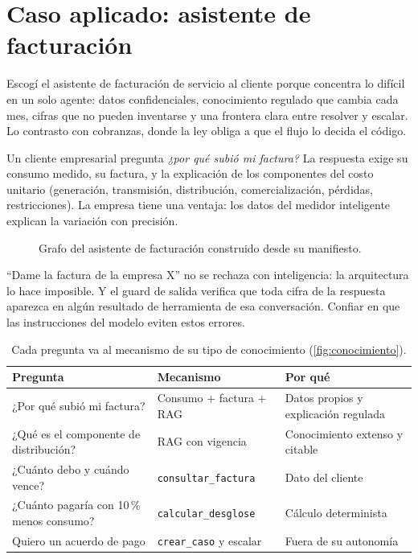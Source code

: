 \section{Caso aplicado: asistente de facturación}
\label{sec:caso}
\begin{respuesta}
Escogí el asistente de facturación de servicio al cliente porque concentra lo difícil en un solo
agente: datos confidenciales, conocimiento regulado que cambia cada mes, cifras que no pueden inventarse y
una frontera clara entre resolver y escalar. Lo contrasto con cobranzas, donde la ley
obliga a que el flujo lo decida el código.
\end{respuesta}

Un cliente empresarial pregunta \emph{¿por qué subió mi factura?} La respuesta exige su
consumo medido, su factura, y la explicación de los componentes del costo unitario
(generación, transmisión, distribución, comercialización, pérdidas, restricciones). La empresa tiene
una ventaja: los datos del medidor inteligente explican la variación con precisión.

\begin{figure}[!htbp]
  \centering
  
  \caption{Grafo del asistente de facturación construido desde su manifiesto.}
  \label{fig:facturacion}
\end{figure}

{``Dame la factura de la empresa X'' no se rechaza con inteligencia: la arquitectura lo hace
imposible. Y el guard de salida verifica que toda cifra de la respuesta aparezca en algún
resultado de herramienta de esa conversación.}
{Confiar en que las instrucciones del modelo eviten estos errores.}

\begin{table}[!htbp]
\centering\small
\caption{Cada pregunta va al mecanismo de su tipo de conocimiento (\cref{fig:conocimiento}).}
\label{tab:preguntas}
\renewcommand{\arraystretch}{1.1}
\begin{tabularx}{\textwidth}{@{}L{4.6cm}L{4.6cm}Y@{}}
\toprule
\textbf{Pregunta} & \textbf{Mecanismo} & \textbf{Por qué}\\
\midrule
¿Por qué subió mi factura? & Consumo + factura + RAG & Datos propios y explicación regulada\\
¿Qué es el componente de distribución? & RAG con vigencia & Conocimiento extenso y citable\\
¿Cuánto debo y cuándo vence? & \texttt{consultar\_factura} & Dato del cliente\\
¿Cuánto pagaría con 10\,\% menos consumo? & \texttt{calcular\_desglose} & Cálculo determinista\\
Quiero un acuerdo de pago & \texttt{crear\_caso} y escalar & Fuera de su autonomía\\
\bottomrule
\end{tabularx}
\end{table}

